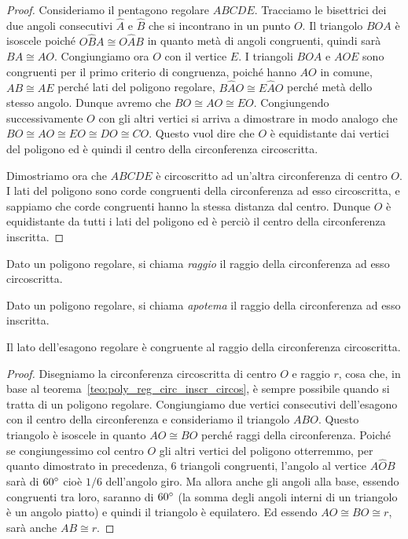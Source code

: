 \begin{proof}
Consideriamo il pentagono regolare $ABCDE$. Tracciamo le bisettrici dei due angoli consecutivi $\widehat{A}$ e $\widehat{B}$ che si incontrano in un punto $O$. Il triangolo $BOA$ è isoscele poiché $O\widehat{B}A\cong O\widehat{A}B$ in quanto metà di angoli congruenti, quindi sarà $BA\cong AO$. Congiungiamo ora $O$ con il vertice $E$. I triangoli $BOA$ e $AOE$ sono congruenti per il primo criterio di congruenza, poiché hanno $AO$ in comune, $AB\cong AE$ perché lati del poligono regolare, $B\widehat{A}O\cong E\widehat{A}O$ perché metà dello stesso angolo. Dunque avremo che $BO\cong AO\cong EO$. Congiungendo successivamente $O$ con gli altri vertici si arriva a dimostrare in modo analogo che $BO\cong AO\cong EO\cong DO\cong CO$. Questo vuol dire che $O$ è equidistante dai vertici del poligono ed è quindi il centro della circonferenza circoscritta.

Dimostriamo ora che $ABCDE$ è circoscritto ad un'altra circonferenza di centro $O$. I lati del poligono sono corde congruenti della circonferenza ad esso circoscritta, e sappiamo che corde congruenti hanno la stessa distanza dal centro. Dunque $O$ è equidistante da tutti i lati del poligono ed è perciò il centro della circonferenza inscritta. 
\end{proof}

\begin{definizione}
Dato un poligono regolare, si chiama \emph{raggio} il raggio della circonferenza ad esso circoscritta.
\end{definizione}

\begin{definizione}
Dato un poligono regolare, si chiama \emph{apotema} il raggio della circonferenza ad esso inscritta.
\end{definizione}

\begin{teorema}
Il lato dell'esagono regolare è congruente al raggio della circonferenza circoscritta.
\end{teorema}

\begin{figure}[!htb]
	\centering
\end{figure}

\begin{proof}
Disegniamo la circonferenza circoscritta di centro $O$ e raggio $r$, cosa che, in base al teorema~\ref{teo:poly_reg_circ_inscr_circos}, è sempre possibile quando si tratta di un poligono regolare. Congiungiamo due vertici consecutivi dell'esagono con il centro della circonferenza e consideriamo il triangolo $ABO$. Questo triangolo è isoscele in quanto $AO\cong BO$ perché raggi della circonferenza. Poiché se congiungessimo col centro $O$ gli altri vertici del poligono otterremmo, per quanto dimostrato in precedenza, 6 triangoli congruenti, l'angolo al vertice $A\widehat{O}B$ sarà di $60{}^{\circ}$ cioè $1/6$ dell'angolo giro. Ma allora anche gli angoli alla base, essendo congruenti tra loro, saranno di $60{}^{\circ}$ (la somma degli angoli interni di un triangolo è un angolo piatto) e quindi il triangolo è equilatero. Ed essendo $AO\cong BO\cong r$, sarà anche $AB\cong r$. 
\end{proof}


\newpage



\cleardoublepage
